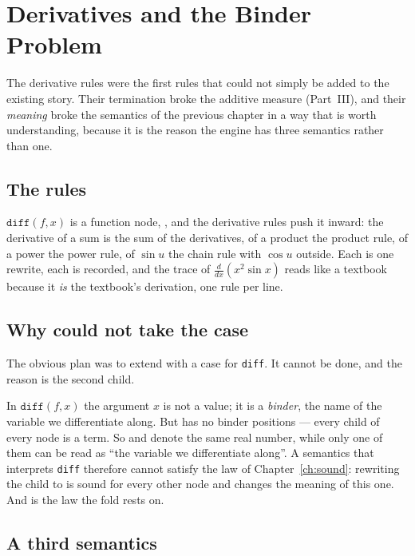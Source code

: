 \chapter{Derivatives and the Binder Problem}\label{ch:deriv}

The derivative rules were the first rules that could not simply be added to the existing story.
Their termination broke the additive measure (Part~III), and their \emph{meaning} broke the
semantics of the previous chapter in a way that is worth understanding, because it is the
reason the engine has three semantics rather than one.

\section{The rules}

$\texttt{diff}(f, x)$ is a function node, , and the derivative rules
push it inward: the derivative of a sum is the sum of the derivatives, of a product the product
rule, of a power the power rule, of $\sin u$ the chain rule with $\cos u$ outside. Each is one
rewrite, each is recorded, and the trace of $\frac{d}{dx}(x^2 \sin x)$ reads like a textbook
because it \emph{is} the textbook's derivation, one rule per line.

\section{Why  could not take the case}

The obvious plan was to extend  with a case for \texttt{diff}. It cannot be done, and
the reason is the second child.

In $\texttt{diff}(f, x)$ the argument $x$ is not a value; it is a \emph{binder}, the name of the
variable we differentiate along. But  has no binder positions --- every child of every
node is a term. So  and  denote the same real number, while only one
of them can be read as ``the variable we differentiate along''. A semantics that interprets
\texttt{diff} therefore cannot satisfy the  law of Chapter~\ref{ch:sound}: rewriting
the child  to  is sound for every other node and changes the meaning
of this one. And  is the law the fold rests on.

\section{A third semantics}

